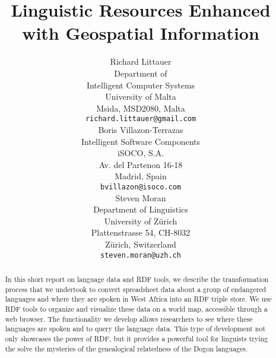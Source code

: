 \documentclass[11pt]{article}
\title{Linguistic Resources Enhanced with Geospatial Information}
\author{Richard Littauer \\
Department of \\
Intelligent Computer Systems \\
University of Malta \\ 
Msida, MSD2080, Malta \\
  {\tt richard.littauer@gmail.com} \\\And
  Boris Villazon-Terrazas \\
  Intelligent Software Components \\
   iSOCO, S.A. \\
   Av. del Partenon 16-18 \\
   Madrid, Spain\\
{\tt bvillazon@isoco.com} \\\And
Steven Moran \\
Department of Linguistics \\
 University of Z\"urich \\
  Plattenstrasse 54, CH-8032 \\
  Z\"urich, Switzerland \\
  {\tt steven.moran@uzh.ch} \\}
\date{}
\begin{document}
\maketitle
\begin{abstract}

In this short report on language data and RDF tools, we describe the transformation process that we undertook to convert spreadsheet data about a group of endangered languages and where they are spoken in West Africa into an RDF triple store. We use RDF tools to organize and visualize these data on a world map, accessible through a web browser. The functionality we develop allows researchers to see where these languages are spoken and to query the language data. This type of development not only showcases the power of RDF, but it provides a powerful tool for linguists trying the solve the mysteries of the genealogical relatedness of the Dogon languages.

\end{abstract}
\end{document}
